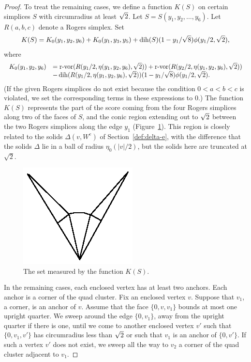 \begin{proof}
To treat the remaining cases, we define a function $K(S)$ on
certain simplices $S$ with circumradius at least $\sqrt2$. Let
$S=S(y_1,y_2,\ldots,y_6)$.  Let $R(a,b,c)$ denote a Rogers
simplex. Set
    \begin{equation}
    K(S) = K_0(y_1,y_2,y_6)+K_0(y_1,y_3,y_5)
    + \operatorname{dih}(S)(1-y_1/\sqrt8) \phi(y_1/2,\sqrt2),
    \label{eqn:KS}
    \end{equation}
where
    $$
    \begin{array}{lll}
    K_0(y_1,y_2,y_6) &= {\operatorname{r-vor}}(R(y_1/2,\eta(y_1,y_2,y_6),\sqrt2))
        +{\operatorname{r-vor}}(R(y_2/2,\eta(y_1,y_2,y_6),\sqrt2))\\
        &- \operatorname{dih}(R(y_1/2,\eta(y_1,y_2,y_6),\sqrt2))
        (1-y_1/\sqrt8)\phi(y_1/2,\sqrt2).
    \end{array}
    $$
(If the given Rogers simplices do not exist because the condition
$0<a<b<c$ is violated, we set the corresponding terms in these
expressions to 0.) The function $K(S)$ represents the part of the
score coming from the four Rogers simplices along two of the faces
of $S$, and the conic region extending out to $\sqrt2$ between the
two Rogers simplices along the edge $y_1$ (Figure~\ref{fig:KS}).
This region is closely related to the solids $\Delta (v, W ^e)$ of
Section~\ref{def:delta-e}, with the difference that the solids
$\Delta$ lie in a ball of radius $\eta_0(|v|/2)$, but the solids
here are truncated at $\sqrt2$.

\begin{figure}[htb]
  \centering
  \includegraphics{PS/diag43.ps}
  \caption{The set measured by the function $K(S)$.}
  \label{fig:KS}
\end{figure}

In the remaining cases, each enclosed vertex has at least two
anchors.  Each anchor is a corner of the quad cluster.  Fix an
enclosed vertex $v$. Suppose that $v_1$, a corner, is an anchor of
$v$. Assume that the face $\{0,v,v_1\}$ bounds at most one upright
quarter. We sweep around the edge $\{0,v_1\}$, away from the
upright quarter if there is one,  until we come to another
enclosed vertex $v'$ such that $\{0,v_1,v'\}$ has circumradius
less than $\sqrt2$ or such that $v_1$ is an anchor of $\{0,v'\}$.
If such a vertex $v'$ does not exist, we sweep all the way to
$v_2$ a corner of the quad cluster adjacent to $v_1$.


\end{proof}
